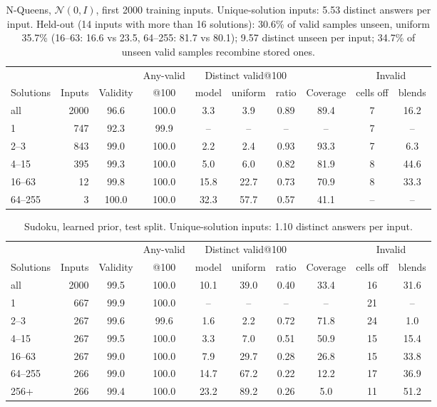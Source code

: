 \documentclass[11pt]{article}
\begin{document}
\begin{table}[H]
\centering\small
\begin{tabular}{@{}lrcccccccc@{}}
\toprule
& & & Any-valid & \multicolumn{3}{c}{Distinct valid@100} & & \multicolumn{2}{c}{Invalid} \\
\cmidrule(lr){5-7}\cmidrule(l){9-10}
Solutions & Inputs & Validity & @100 & model & uniform & ratio & Coverage & cells off & blends \\
\midrule
all & 2000 & 96.6 & 100.0 & 3.3 & 3.9 & 0.89 & 89.4 & 7 & 16.2 \\
1 & 747 & 92.3 & 99.9 & -- & -- & -- & -- & 7 & -- \\
2--3 & 843 & 99.0 & 100.0 & 2.2 & 2.4 & 0.93 & 93.3 & 7 & 6.3 \\
4--15 & 395 & 99.3 & 100.0 & 5.0 & 6.0 & 0.82 & 81.9 & 8 & 44.6 \\
16--63 & 12 & 99.8 & 100.0 & 15.8 & 22.7 & 0.73 & 70.9 & 8 & 33.3 \\
64--255 & 3 & 100.0 & 100.0 & 32.3 & 57.7 & 0.57 & 41.1 & -- & -- \\
\bottomrule
\end{tabular}
\caption{N-Queens, $\mathcal{N}(0,I)$, first 2000 training inputs. Unique-solution inputs: 5.53 distinct answers per input. Held-out (14 inputs with more than 16 solutions): 30.6\% of valid samples unseen, uniform 35.7\% (16--63: 16.6 vs 23.5, 64--255: 81.7 vs 80.1); 9.57 distinct unseen per input; 34.7\% of unseen valid samples recombine stored ones.}
\end{table}

\begin{table}[H]
\centering\small
\begin{tabular}{@{}lrcccccccc@{}}
\toprule
& & & Any-valid & \multicolumn{3}{c}{Distinct valid@100} & & \multicolumn{2}{c}{Invalid} \\
\cmidrule(lr){5-7}\cmidrule(l){9-10}
Solutions & Inputs & Validity & @100 & model & uniform & ratio & Coverage & cells off & blends \\
\midrule
all & 2000 & 99.5 & 100.0 & 10.1 & 39.0 & 0.40 & 33.4 & 16 & 31.6 \\
1 & 667 & 99.9 & 100.0 & -- & -- & -- & -- & 21 & -- \\
2--3 & 267 & 99.6 & 99.6 & 1.6 & 2.2 & 0.72 & 71.8 & 24 & 1.0 \\
4--15 & 267 & 99.5 & 100.0 & 3.3 & 7.0 & 0.51 & 50.9 & 15 & 15.4 \\
16--63 & 267 & 99.0 & 100.0 & 7.9 & 29.7 & 0.28 & 26.8 & 15 & 33.8 \\
64--255 & 266 & 99.0 & 100.0 & 14.7 & 67.2 & 0.22 & 12.2 & 17 & 36.9 \\
256+ & 266 & 99.4 & 100.0 & 23.2 & 89.2 & 0.26 & 5.0 & 11 & 51.2 \\
\bottomrule
\end{tabular}
\caption{Sudoku, learned prior, test split. Unique-solution inputs: 1.10 distinct answers per input.}
\end{table}
\end{document}
